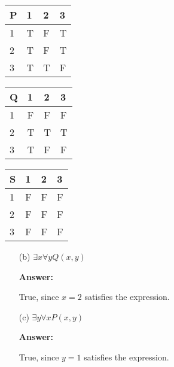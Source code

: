 \documentclass[12pt]{extreport}
\newcommand{\answer}[0]{\medskip \textbf{Answer:} \medskip}
\begin{document}
\begin{enumerate}
    \begin{minipage}{.32\textwidth}
        \centering
        \begin{tabular}{|l|l|l|l|}
            \hline
            P & 1 & 2 & 3 \\ \hline
            1 & T & F & T \\ \hline
            2 & T & F & T \\ \hline
            3 & T & T & F \\ \hline
        \end{tabular}
    \end{minipage}
    \begin{minipage}{.32\textwidth}
        \centering
        \begin{tabular}{|l|l|l|l|}
            \hline
            Q & 1 & 2 & 3 \\ \hline
            1 & F & F & F \\ \hline
            2 & T & T & T \\ \hline
            3 & T & F & F \\ \hline
        \end{tabular}
    \end{minipage}
    \hfill
    \begin{minipage}{.32\textwidth}
        \centering
        \begin{tabular}{|l|l|l|l|}
            \hline
            S & 1 & 2 & 3 \\ \hline
            1 & F & F & F \\ \hline
            2 & F & F & F \\ \hline
            3 & F & F & F \\ \hline
        \end{tabular}
    \end{minipage}

        \begin{enumerate}
            
            \item[(b)] \( \exists x \forall y Q(x, y) \)

                \answer

                True, since \( x = 2 \) satisfies the expression.

            \item[(c)] \( \exists y \forall x P(x, y) \)
            
                \answer

                True, since \( y = 1 \) satisfies the expression.


\end{enumerate}
\end{enumerate}
\end{document}

